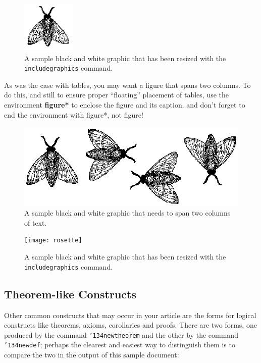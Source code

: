 \documentclass{sig-alternate-05-2015}
\begin{document}
\begin{figure}
\centering
\includegraphics[height=1in, width=1in]{fly}
\caption{A sample black and white graphic
that has been resized with the \texttt{includegraphics} command.}
\end{figure}


As was the case with tables, you may want a figure
that spans two columns.  To do this, and still to
ensure proper ``floating'' placement of tables, use the environment
\textbf{figure*} to enclose the figure and its caption.
and don't forget to end the environment with
{figure*}, not {figure}!

\begin{figure}
\centering
\includegraphics{flies}
\caption{A sample black and white graphic
that needs to span two columns of text.}
\end{figure}


\begin{figure}
\centering
\texttt{[image: rosette]}
\caption{A sample black and white graphic that has
been resized with the \texttt{includegraphics} command.}
\vskip -6pt
\end{figure}

\subsection{Theorem-like Constructs}
Other common constructs that may occur in your article are
the forms for logical constructs like theorems, axioms,
corollaries and proofs.  There are
two forms, one produced by the
command \texttt{{\char'134}newtheorem} and the
other by the command \texttt{{\char'134}newdef}; perhaps
the clearest and easiest way to distinguish them is
to compare the two in the output of this sample document:
\end{document}
